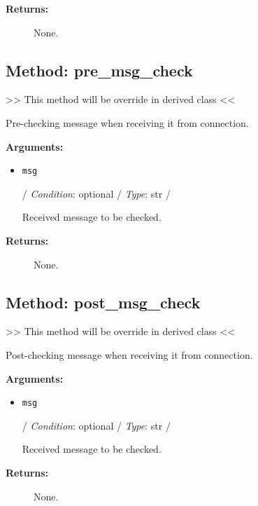 \begin{description}
\item[\textbf{Returns:}]
None.
\end{description}

\hypertarget{qconnectbase-connection-base-method-pre_msg_check-19}{%
\subsection{Method: pre\_msg\_check}\label{qconnectbase-connection-base-method-pre_msg_check-19}}

\textgreater\textgreater{} This method will be override in derived class
\textless\textless{}

Pre-checking message when receiving it from connection.

\textbf{Arguments:}

\begin{itemize}
\item
  \texttt{msg}

  / \emph{Condition}: optional / \emph{Type}: str /

  Received message to be checked.
\end{itemize}

\begin{description}
\item[\textbf{Returns:}]
None.
\end{description}

\hypertarget{qconnectbase-connection-base-method-post_msg_check-20}{%
\subsection{Method: post\_msg\_check}\label{qconnectbase-connection-base-method-post_msg_check-20}}

\textgreater\textgreater{} This method will be override in derived class
\textless\textless{}

Post-checking message when receiving it from connection.

\textbf{Arguments:}

\begin{itemize}
\item
  \texttt{msg}

  / \emph{Condition}: optional / \emph{Type}: str /

  Received message to be checked.
\end{itemize}

\begin{description}
\item[\textbf{Returns:}]
None.
\end{description}
